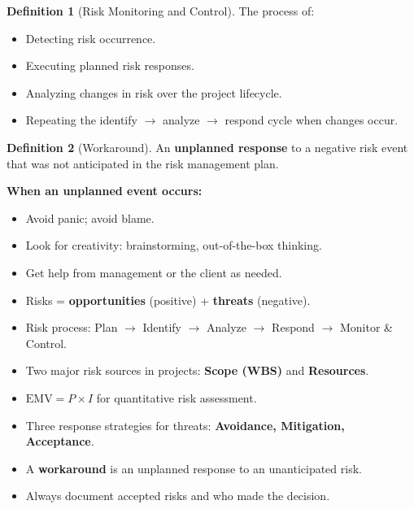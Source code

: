 \documentclass[11pt,a4paper]{article}
\theoremstyle{definition}
\newtheorem{definition}{Definition}[section]
\theoremstyle{plain}
\begin{document}
\begin{definition}[Risk Monitoring and Control]
The process of:
\begin{itemize}[nosep]
  \item Detecting risk occurrence.
  \item Executing planned risk responses.
  \item Analyzing changes in risk over the project lifecycle.
  \item Repeating the identify $\to$ analyze $\to$ respond cycle when changes occur.
\end{itemize}
\end{definition}

\begin{definition}[Workaround]
An \textbf{unplanned response} to a negative risk event that was not anticipated in the risk management plan.
\end{definition}

\textbf{When an unplanned event occurs:}
\begin{itemize}[nosep]
  \item Avoid panic; avoid blame.
  \item Look for creativity: brainstorming, out-of-the-box thinking.
  \item Get help from management or the client as needed.
\end{itemize}

\begin{keytakeaways}
\begin{itemize}[nosep]
  \item Risks = \textbf{opportunities} (positive) + \textbf{threats} (negative).
  \item Risk process: Plan $\to$ Identify $\to$ Analyze $\to$ Respond $\to$ Monitor \& Control.
  \item Two major risk sources in projects: \textbf{Scope (WBS)} and \textbf{Resources}.
  \item $\mathrm{EMV} = P \times I$ for quantitative risk assessment.
  \item Three response strategies for threats: \textbf{Avoidance, Mitigation, Acceptance}.
  \item A \textbf{workaround} is an unplanned response to an unanticipated risk.
  \item Always document accepted risks and who made the decision.
\end{itemize}
\end{keytakeaways}


\end{document}
